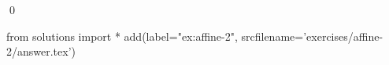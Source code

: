 
\begin{ex} 
  \label{ex:affine-2}
  
  \qed
\end{ex} 
\begin{python0}
from solutions import *
add(label="ex:affine-2",
    srcfilename='exercises/affine-2/answer.tex') 
\end{python0}
